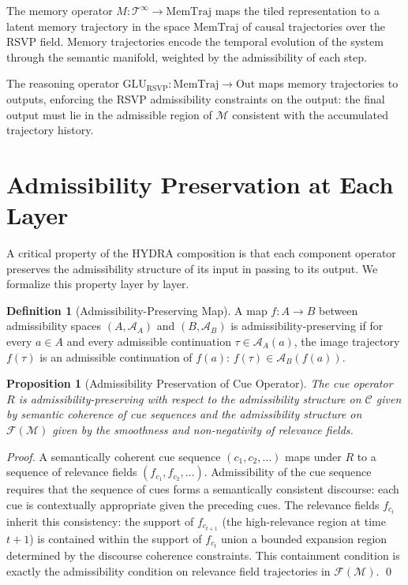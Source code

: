 \documentclass[12pt, a4paper, openany]{book}
\theoremstyle{plain}
\newtheorem{proposition}[theorem]{Proposition}
\theoremstyle{definition}
\newtheorem{definition}[theorem]{Definition}
\theoremstyle{remark}
\newcommand{\Adm}{\mathcal{A}}
\begin{document}
The memory operator $M: \mathcal{T}^\infty \to \mathrm{MemTraj}$ maps the tiled representation to a latent memory trajectory in the space $\mathrm{MemTraj}$ of causal trajectories over the RSVP field. Memory trajectories encode the temporal evolution of the system through the semantic manifold, weighted by the admissibility of each step.

The reasoning operator $\mathrm{GLU}_{\mathrm{RSVP}}: \mathrm{MemTraj} \to \mathrm{Out}$ maps memory trajectories to outputs, enforcing the RSVP admissibility constraints on the output: the final output must lie in the admissible region of $\mathcal{M}$ consistent with the accumulated trajectory history.

\section{Admissibility Preservation at Each Layer}

A critical property of the HYDRA composition is that each component operator preserves the admissibility structure of its input in passing to its output. We formalize this property layer by layer.

\begin{definition}[Admissibility-Preserving Map]
A map $f: A \to B$ between admissibility spaces $(A, \Adm_A)$ and $(B, \Adm_B)$ is admissibility-preserving if for every $a \in A$ and every admissible continuation $\tau \in \Adm_A(a)$, the image trajectory $f(\tau)$ is an admissible continuation of $f(a)$: $f(\tau) \in \Adm_B(f(a))$.
\end{definition}

\begin{proposition}[Admissibility Preservation of Cue Operator]
The cue operator $R$ is admissibility-preserving with respect to the admissibility structure on $\mathcal{C}$ given by semantic coherence of cue sequences and the admissibility structure on $\mathcal{F}(\mathcal{M})$ given by the smoothness and non-negativity of relevance fields.
\end{proposition}

\begin{proof}
A semantically coherent cue sequence $(c_1, c_2, \ldots)$ maps under $R$ to a sequence of relevance fields $(f_{c_1}, f_{c_2}, \ldots)$. Admissibility of the cue sequence requires that the sequence of cues forms a semantically consistent discourse: each cue is contextually appropriate given the preceding cues. The relevance fields $f_{c_t}$ inherit this consistency: the support of $f_{c_{t+1}}$ (the high-relevance region at time $t+1$) is contained within the support of $f_{c_t}$ union a bounded expansion region determined by the discourse coherence constraints. This containment condition is exactly the admissibility condition on relevance field trajectories in $\mathcal{F}(\mathcal{M})$. \qed
\end{proof}
\end{document}
